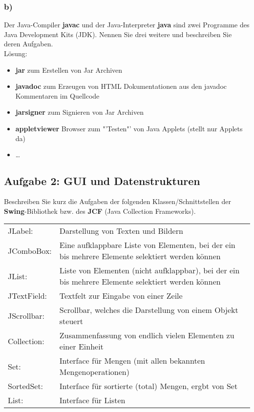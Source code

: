 \documentclass[a4paper, 10pt]{article}
\begin{document}
\subsubsection*{b)}

Der Java-Compiler \textbf{javac} und der Java-Interpreter \textbf{java} sind zwei Programme des
Java Development Kits (JDK). Nennen Sie drei weitere und beschreiben Sie deren
Aufgaben.\\

Lösung:\\

\begin{itemize}
  \item \textbf{jar} zum Erstellen von Jar Archiven
  \item \textbf{javadoc} zum Erzeugen von HTML Dokumentationen aus den javadoc Kommentaren im Quellcode
  \item \textbf{jarsigner} zum Signieren von Jar Archiven
  \item \textbf{appletviewer} Browser zum "'Testen"' von Java Applets (stellt nur Applets da)
  \item \dots
\end{itemize}

\subsection*{Aufgabe 2: GUI und Datenstrukturen}
Beschreiben Sie kurz die Aufgaben der folgenden Klassen/Schnittstellen der \textbf{Swing}-Bibliothek bzw. des \textbf{JCF} (Java Collection Frameworks).

\begin{tabular}{ll}
JLabel: 	& Darstellung von Texten und Bildern\\
JComboBox: 	& Eine aufklappbare Liste von Elementen, bei der ein bis mehrere Elemente selektiert werden können\\
JList: 		& Liste von Elementen (nicht aufklappbar), bei der ein bis mehrere Elemente selektiert werden können\\
JTextField: & Textfelt zur Eingabe von einer Zeile\\
JScrollbar: & Scrollbar, welches die Darstellung von einem Objekt steuert\\
Collection: & Zusammenfassung von endlich vielen Elementen zu einer Einheit\\
Set: 		& Interface für Mengen (mit allen bekannten Mengenoperationen)\\
SortedSet: 	& Interface für sortierte (total) Mengen, ergbt von Set\\
List: 		& Interface für Listen 
\end{tabular}
\end{document}
